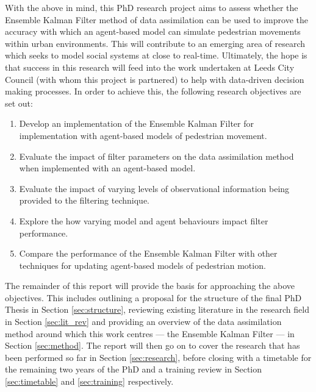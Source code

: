 With the above in mind, this PhD research project aims to assess whether the
Ensemble Kalman Filter method of data assimilation can be used to improve the
accuracy with which an agent-based model can simulate pedestrian movements
within urban environments.
This will contribute to an emerging area of research which seeks to
model social systems at close to real-time.
Ultimately, the hope is that success in this research will feed into the work
undertaken at Leeds City Council (with whom this project is partnered) to help
with data-driven decision making processes.
In order to achieve this, the following research objectives are set out:
\begin{enumerate}
    \item Develop an implementation of the Ensemble Kalman Filter for
        implementation with agent-based models of pedestrian movement.
    \item Evaluate the impact of filter parameters on the data assimilation
        method when implemented with an agent-based model.
    \item Evaluate the impact of varying levels of observational information
        being provided to the filtering technique.
    \item Explore the how varying model and agent behaviours impact filter
        performance.
    \item Compare the performance of the Ensemble Kalman Filter with other
        techniques for updating agent-based models of pedestrian motion.
\end{enumerate}

The remainder of this report will provide the basis for approaching the above
objectives.
This includes outlining a proposal for the structure of the final PhD Thesis in
Section \ref{sec:structure}, reviewing existing literature in the research field
in Section \ref{sec:lit_rev} and providing an overview of the data assimilation
method around which this work centres --- the Ensemble Kalman Filter --- in
Section \ref{sec:method}.
The report will then go on to cover the research that has been performed so far
in Section \ref{sec:research}, before closing with a timetable for the remaining
two years of the PhD and a training review in Section \ref{sec:timetable} and
\ref{sec:training} respectively.


